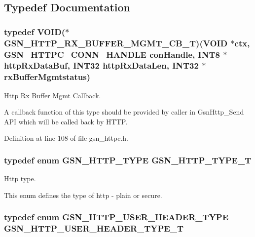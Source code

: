 \subsection{Typedef Documentation}
\hypertarget{a00665_ga4f384de3cef47243fc55fee382201152}{
\subsubsection[{GSN\_\-HTTP\_\-RX\_\-BUFFER\_\-MGMT\_\-CB\_\-T}]{\setlength{\rightskip}{0pt plus 5cm}typedef VOID($\ast$  {\bf GSN\_\-HTTP\_\-RX\_\-BUFFER\_\-MGMT\_\-CB\_\-T})(VOID $\ast$ctx, {\bf GSN\_\-HTTPC\_\-CONN\_\-HANDLE} conHandle, {\bf INT8} $\ast$httpRxDataBuf, {\bf INT32} httpRxDataLen, {\bf INT32} $\ast$rxBufferMgmtstatus)}}
\label{a00665_ga4f384de3cef47243fc55fee382201152}


Http Rx Buffer Mgmt Callback. 

A callback function of this type should be provided by caller in GsnHttp\_\-Send API which will be called back by HTTP. 

Definition at line 108 of file gsn\_\-httpc.h.

\hypertarget{a00665_ga72317a89375e9f3d889df0439bff53ba}{
\subsubsection[{GSN\_\-HTTP\_\-TYPE\_\-T}]{\setlength{\rightskip}{0pt plus 5cm}typedef enum {\bf GSN\_\-HTTP\_\-TYPE} {\bf GSN\_\-HTTP\_\-TYPE\_\-T}}}
\label{a00665_ga72317a89375e9f3d889df0439bff53ba}


Http type. 

This enum defines the type of http -\/ plain or secure. \hypertarget{a00665_gacdf2ed5f026ce7b549a8151c0a5f0129}{
\subsubsection[{GSN\_\-HTTP\_\-USER\_\-HEADER\_\-TYPE\_\-T}]{\setlength{\rightskip}{0pt plus 5cm}typedef enum {\bf GSN\_\-HTTP\_\-USER\_\-HEADER\_\-TYPE}   {\bf GSN\_\-HTTP\_\-USER\_\-HEADER\_\-TYPE\_\-T}}}
\label{a00665_gacdf2ed5f026ce7b549a8151c0a5f0129}


